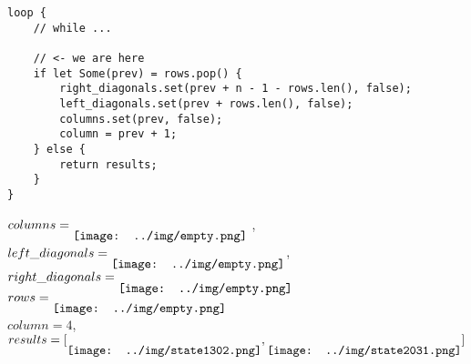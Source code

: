 \begin{frame}[fragile]
    \begin{verbatim}
loop {
    // while ...
    
    // <- we are here
    if let Some(prev) = rows.pop() {
        right_diagonals.set(prev + n - 1 - rows.len(), false);
        left_diagonals.set(prev + rows.len(), false);
        columns.set(prev, false);
        column = prev + 1;    
    } else {
        return results;
    }
}
    \end{verbatim}
    $columns = \raisebox{-2ex}{\texttt{[image: ../img/empty.png]}}$ ,
    $left\_diagonals = \raisebox{-2ex}{\texttt{[image: ../img/empty.png]}}$,
    $right\_diagonals = \raisebox{-2ex}{\texttt{[image: ../img/empty.png]}}$ \\
    $rows = \raisebox{-2ex}{\texttt{[image: ../img/empty.png]}}$ \\
    $column = 4$, $results = [
    \raisebox{-2ex}{\texttt{[image: ../img/state1302.png]}},
    \raisebox{-2ex}{\texttt{[image: ../img/state2031.png]}}
    ]$
\end{frame}